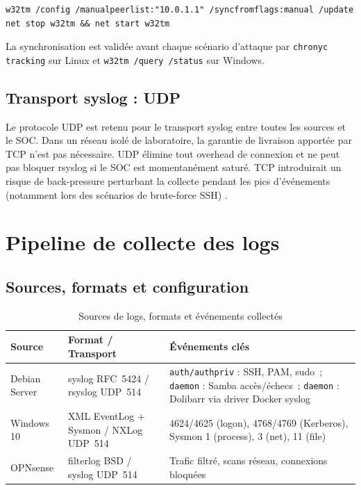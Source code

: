 \documentclass[12pt,a4paper]{article}
\begin{document}
\begin{lstlisting}
w32tm /config /manualpeerlist:"10.0.1.1" /syncfromflags:manual /update
net stop w32tm && net start w32tm
\end{lstlisting}

La synchronisation est validée avant chaque scénario d'attaque par
\texttt{chronyc tracking} sur Linux et \texttt{w32tm /query /status}
sur Windows.

\subsection{Transport syslog : UDP}

Le protocole UDP est retenu pour le transport syslog entre toutes les
sources et le SOC. Dans un réseau isolé de laboratoire, la garantie de
livraison apportée par TCP n'est pas nécessaire. UDP élimine tout overhead
de connexion et ne peut pas bloquer rsyslog si le SOC est momentanément
saturé. TCP introduirait un risque de back-pressure perturbant la collecte
pendant les pics d'événements (notamment lors des scénarios de brute-force
SSH) \cite{rsyslog_udp}.

\section{Pipeline de collecte des logs}

\subsection{Sources, formats et configuration}

\begin{table}[H]
\centering
\caption{Sources de logs, formats et événements collectés}
\label{tab:sources}
\begin{tabularx}{\textwidth}{|l|l|X|}
\hline
\textbf{Source} & \textbf{Format / Transport} & \textbf{Événements clés} \\
\hline
Debian Server
  & syslog RFC~5424 / rsyslog UDP~514
  & \texttt{auth/authpriv} : SSH, PAM, sudo~;
    \texttt{daemon} : Samba accès/échecs~;
    \texttt{daemon} : Dolibarr via driver Docker syslog \\
\hline
Windows 10
  & XML EventLog + Sysmon / NXLog UDP~514
  & 4624/4625 (logon), 4768/4769 (Kerberos),
    Sysmon 1 (process), 3 (net), 11 (file) \\
\hline
OPNsense
  & filterlog BSD / syslog UDP~514
  & Trafic filtré, scans réseau, connexions bloquées \\
\hline
\end{tabularx}
\end{table}
\end{document}
